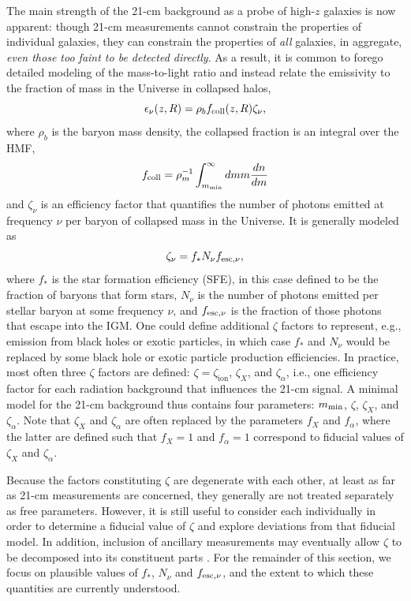 The main strength of the 21-cm background as a probe of high-$z$ galaxies is now apparent: though 21-cm measurements cannot constrain the properties of individual galaxies, they can constrain the properties of \textit{all} galaxies, in aggregate, \textit{even those too faint to be detected directly}. As a result, it is common to forego detailed modeling of the mass-to-light ratio and instead relate the emissivity to the fraction of mass in the Universe in collapsed halos,
\begin{equation}
	\epsilon_{\nu}(z, R) = \rho_b f_{\text{coll}}(z, R) \zeta_{\nu} ,
\end{equation}
where $\rho_b$ is the baryon mass density, the collapsed fraction is an integral over the HMF,
\begin{equation}
	f_{\text{coll}} = \rho_m^{-1} \int_{m_{\text{min}}}^{\infty} dm m \frac{dn}{dm}
\end{equation}
and $\zeta_{\nu}$ is an efficiency factor that quantifies the number of photons emitted at frequency $\nu$ per baryon of collapsed mass in the Universe. It is generally modeled as
\begin{equation}
	\zeta_{\nu} = f_{\ast} N_{\nu} f_{\text{esc},\nu} , \label{eq:zeta}
\end{equation}
where $f_{\ast}$ is the star formation efficiency (SFE), in this case defined to be the fraction of baryons that form stars, $N_{\nu}$ is the number of photons emitted per stellar baryon at some frequency $\nu$, and $f_{\text{esc},\nu}$ is the fraction of those photons that escape into the IGM. One could define additional $\zeta$ factors to represent, e.g., emission from black holes or exotic particles, in which case $f_{\ast}$ and $N_{\nu}$ would be replaced by some black hole or exotic particle production efficiencies. In practice, most often three $\zeta$ factors are defined: $\zeta=\zeta_{\mathrm{ion}}$, $\zeta_X$, and $\zeta_{\alpha}$, i.e., one efficiency factor for each radiation background that influences the 21-cm signal. A minimal model for the 21-cm background thus contains four parameters: $m_{\text{min}}$, $\zeta$, $\zeta_X$, and $\zeta_{\alpha}$. Note that  $\zeta_X$ and $\zeta_{\alpha}$ are often replaced by the parameters $f_X$ and $f_{\alpha}$, where the latter are defined such that $f_X=1$ and $f_{\alpha}=1$ correspond to fiducial values of $\zeta_X$ and $\zeta_{\alpha}$.

Because the factors constituting $\zeta$ are degenerate with each other, at least as far as 21-cm measurements are concerned, they generally are not treated separately as free parameters. However, it is still useful to consider each individually in order to determine a fiducial value of $\zeta$ and explore deviations from that fiducial model. In addition, inclusion of ancillary measurements may eventually allow $\zeta$ to be decomposed into its constituent parts \cite{Mirocha2017,Park2019,Greig2019}. For the remainder of this section, we focus on plausible values of $f_{\ast}$, $N_{\nu}$ and $f_{\text{esc},\nu}$, and the extent to which these quantities are currently understood.

